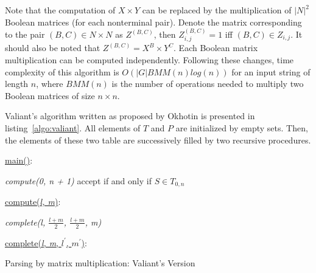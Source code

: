 Note that the computation of $X \times Y$  can be replaced by the multiplication of $|N|^2$ Boolean matrices (for each nonterminal pair).
Denote the matrix corresponding to the pair $(B, C) \in N \times N$ as $Z^{(B, C)}$, then $Z_{i, j}^{(B, C)} = 1$ iff $(B, C) \in Z_{i, j}$.
It should also be noted that $Z^{(B, C)} = X^{B} \times Y^{C}$.
Each Boolean matrix multiplication can be computed independently.
Following these changes, time complexity of this algorithm is $O(|G|BMM(n)log(n))$ for an input string of length $n$, where $BMM(n)$ is the number of operations needed to multiply two Boolean matrices of size $n \times n$.

Valiant's algorithm written as proposed by Okhotin is presented in listing~\ref{algo:valiant}.
All elements of $T$ and $P$ are initialized by empty sets.
Then, the elements of these two table are successively filled by two recursive procedures.

\begin{algorithm}[h]
\SetAlgoNoLine
{}
\underline{main()}{:}{

 \textit{compute(0, n + 1)\;}
 accept if and only if $S \in T_{0, n}$
 \linebreak
 }

\underline{compute(\textit{l, m})}{:}{

 \textit{complete(l, $\frac{l+m}{2}$, $\frac{l+m}{2}$, m)}
 \linebreak
 }

\underline{complete(\textit{l, m}, $l^\prime$, $m^\prime$)}{:}{

 }
\caption{Parsing by matrix multiplication: Valiant's Version}
\label{algo:valiant}
\end{algorithm}

